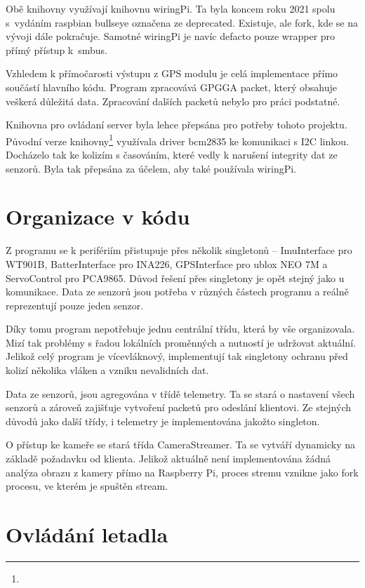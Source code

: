 \documentclass[a4paper,oneside,12pt]{report}
\begin{document}
Obě knihovny využívají knihovnu wiringPi.
Ta byla koncem roku 2021 spolu s~vydáním raspbian bullseye označena ze deprecated.
Existuje, ale fork, kde se na vývoji dále pokračuje.
Samotné wiringPi je navíc defacto pouze wrapper pro přímý přístup k~smbus.

Vzhledem k přímočarosti výstupu z GPS modulu je celá implementace přímo součástí hlavního kódu.
Program zpracovává GPGGA packet, který obsahuje veškerá důležitá data.
Zpracování dalších packetů nebylo pro práci podstatné.

Knihovna pro ovládaní server byla lehce přepsána pro potřeby tohoto projektu.
Původní verze knihovny\footnote{} využívala driver bcm2835 ke komunikaci s I2C linkou.
Docházelo tak ke kolizím s časováním, které vedly k narušení integrity dat ze senzorů.
Byla tak přepsána za účelem, aby také používala wiringPi.

\section{Organizace v kódu}

Z programu se k perifériím přistupuje přes několik singletonů -- ImuInterface pro WT901B, BatterInterface pro INA226, GPSInterface pro ublox NEO 7M a ServoControl pro PCA9865.
Důvod řešení přes singletony je opět stejný jako u komunikace.
Data ze senzorů jsou potřeba v různých částech programu a reálně reprezentují pouze jeden senzor.

Díky tomu program nepotřebuje jednu centrální třídu, která by vše organizovala.
Mizí tak problémy s řadou lokálních proměnných a nutností je udržovat aktuální.
Jelikož celý program je vícevláknový, implementují tak singletony ochranu před kolizí několika vláken a vzniku nevalidních dat.

Data ze senzorů, jsou agregována v třídě telemetry.
Ta se stará o nastavení všech senzorů a zároveň zajišťuje vytvoření packetů pro odeslání klientovi.
Ze stejných důvodů jako další třídy, i telemetry je implementována jakožto singleton.

O přístup ke kameře se stará třída CameraStreamer.
Ta se vytváří dynamicky na základě požadavku od klienta.
Jelikož aktuálně není implementována žádná analýza obrazu z kamery přímo na Raspberry Pi, proces stremu vznikne jako fork procesu, ve kterém je spuštěn stream.

\section{Ovládání letadla}
\end{document}
